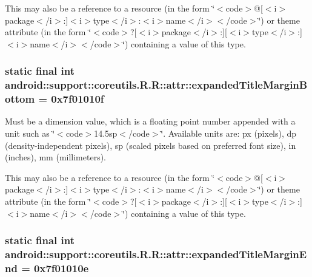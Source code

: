 This may also be a reference to a resource (in the form \char`\"{}$<$code$>$@\mbox{[}$<$i$>$package$<$/i$>$:\mbox{]}$<$i$>$type$<$/i$>$:$<$i$>$name$<$/i$>$$<$/code$>$\char`\"{}) or theme attribute (in the form \char`\"{}$<$code$>$?\mbox{[}$<$i$>$package$<$/i$>$:\mbox{]}\mbox{[}$<$i$>$type$<$/i$>$:\mbox{]}$<$i$>$name$<$/i$>$$<$/code$>$\char`\"{}) containing a value of this type. \hypertarget{classandroid_1_1support_1_1coreutils_1_1_r_1_1attr_e88564beb69c49b31d9076ed39682e9c}{
\subsubsection[{expandedTitleMarginBottom}]{\setlength{\rightskip}{0pt plus 5cm}static final int android::support::coreutils.R.R::attr::expandedTitleMarginBottom = 0x7f01010f}}
\label{classandroid_1_1support_1_1coreutils_1_1_r_1_1attr_e88564beb69c49b31d9076ed39682e9c}


Must be a dimension value, which is a floating point number appended with a unit such as \char`\"{}$<$code$>$14.5sp$<$/code$>$\char`\"{}. Available units are: px (pixels), dp (density-independent pixels), sp (scaled pixels based on preferred font size), in (inches), mm (millimeters). 

This may also be a reference to a resource (in the form \char`\"{}$<$code$>$@\mbox{[}$<$i$>$package$<$/i$>$:\mbox{]}$<$i$>$type$<$/i$>$:$<$i$>$name$<$/i$>$$<$/code$>$\char`\"{}) or theme attribute (in the form \char`\"{}$<$code$>$?\mbox{[}$<$i$>$package$<$/i$>$:\mbox{]}\mbox{[}$<$i$>$type$<$/i$>$:\mbox{]}$<$i$>$name$<$/i$>$$<$/code$>$\char`\"{}) containing a value of this type. \hypertarget{classandroid_1_1support_1_1coreutils_1_1_r_1_1attr_3a642219012cb860c1ce5f79e2c25fea}{
\subsubsection[{expandedTitleMarginEnd}]{\setlength{\rightskip}{0pt plus 5cm}static final int android::support::coreutils.R.R::attr::expandedTitleMarginEnd = 0x7f01010e}}
\label{classandroid_1_1support_1_1coreutils_1_1_r_1_1attr_3a642219012cb860c1ce5f79e2c25fea}


